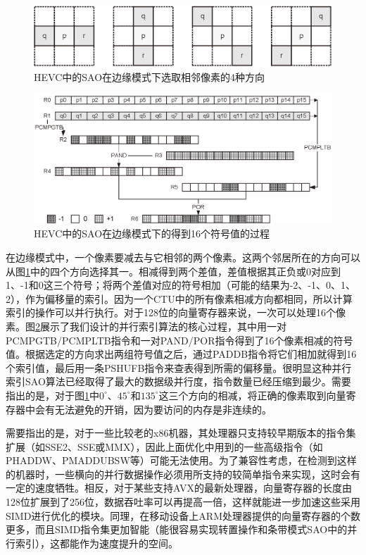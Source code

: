 \begin{figure}[t]
	\centering
	\includegraphics[width = 0.95\linewidth]{eps/SAO_edge_direction}
	\caption{\label{fig:SAO_edge_direction}HEVC中的SAO在边缘模式下选取相邻像素的4种方向}
\end{figure}

\begin{figure}[t]
	\centering
	\includegraphics[width = 0.95\linewidth]{eps/SAO_edge_parallel_index}
	\caption{\label{fig:SAO_edge_parallel_index}HEVC中的SAO在边缘模式下的得到16个符号值的过程}
\end{figure}

在边缘模式中，一个像素要减去与它相邻的两个像素。这两个邻居所在的方向可以从图\ref{fig:SAO_edge_direction}中的四个方向选择其一。相减得到两个差值，差值根据其正负或0对应到1、-1和0这三个符号；将两个差值对应的符号相加（可能的结果为-2、-1、0、1、2），作为偏移量的索引。因为一个CTU中的所有像素相减方向都相同，所以计算索引的操作可以并行执行。对于128位的向量寄存器来说，一次可以处理16个像素。图\ref{fig:SAO_edge_parallel_index}展示了我们设计的并行索引算法的核心过程，其中用一对PCMPGTB/PCMPLTB指令和一对PAND/POR指令得到了16个像素相减的符号值。根据选定的方向求出两组符号值之后，通过PADDB指令将它们相加就得到16个索引值，最后用一条PSHUFB指令来查表得到所需的偏移量。很明显这种并行索引SAO算法已经取得了最大的数据级并行度，指令数量已经压缩到最少。需要指出的是，对于图\ref{fig:SAO_edge_direction}中$0^\circ$、$45^\circ$和$135^\circ$这三个方向的相减，将正确的像素取到向量寄存器中会有无法避免的开销，因为要访问的内存是非连续的。


需要指出的是，对于一些比较老的x86机器，其处理器只支持较早期版本的指令集扩展（如SSE2、SSE或MMX），因此上面优化中用到的一些高级指令（如PHADDW、PMADDUBSW等）可能无法使用。为了兼容性考虑，在检测到这样的机器时，一些横向的并行数据操作必须用所支持的较简单指令来实现，这时会有一定的速度牺牲。相反，对于某些支持AVX的最新处理器，向量寄存器的长度由128位扩展到了256位，数据吞吐率可以再提高一倍，这样就能进一步加速这些采用SIMD进行优化的模块。同理，在移动设备上ARM处理器提供的向量寄存器的个数更多，而且SIMD指令集更加智能（能很容易实现转置操作和条带模式SAO中的并行索引），这都能作为速度提升的空间。

